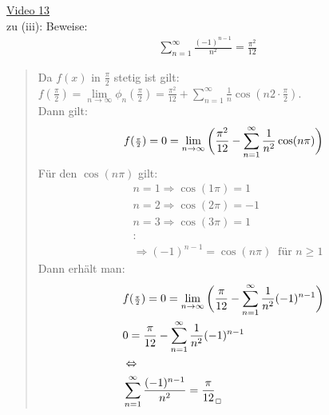 \href{https://youtu.be/IcA3p-nQn7Y}{Video 13}\\
zu (iii): Beweise:\\
\begin{align*}
\sum\limits_{n=1}^{\infty}\frac{(-1)^{n-1}}{n^2}=\frac{\pi^2}{12}
\end{align*}
\begin{quote}
 Da $ f(x) $ in $ \frac{\pi}{2} $ stetig ist gilt: $ f(\frac{\pi}{2})=\lim\limits_ {n\to\infty}\phi_n(\frac{\pi}{2})=\frac{\pi^2}{12}+\sum\limits_{n=1}^{\infty}\frac{1}{n}\cos(n2\cdot\frac{\pi}{2}) $.\\
Dann gilt:\\
\begin{align*}
 f(\genfrac{}{}{}{2}{\pi }{2 })=0=\lim\limits_ {n\to\infty}\bigg(\frac{\pi^2}{12}-\sum\limits_{n=1}^{\infty}\frac{1}{n^2}\cos(n\pi)\bigg)
\end{align*}
Für den $ \cos(n\pi) $ gilt:\\
\begin{align*}
&n=1\Rightarrow \cos(1\pi)=1\\
&n=2\Rightarrow \cos(2\pi)=-1\\
&n=3\Rightarrow \cos(3\pi)=1\\
&\colon\\
&\Rightarrow (-1)^{n-1}=\cos(n\pi)\;\;\text{für } n\geq 1
\end{align*}
Dann erhält man:\\
\begin{align*}
&f(\genfrac{}{}{}{2}{\pi }{2 })=0=\lim\limits_ {n\to\infty}\bigg(\frac{\pi}{12}-\sum\limits_{n=1}^{\infty}\frac{1}{n^2}(-1)^{n-1}\bigg)\\
&0=\frac{\pi}{12}-\sum\limits_{n=1}^{\infty}\frac{1}{n^2}(-1)^{n-1}\\
&\Leftrightarrow\\
&\sum\limits_{n=1}^{\infty}\frac{(-1)^{n-1}}{n^2}=\frac{\pi}{12}_{ _\Box}
\end{align*}
\end{quote}
